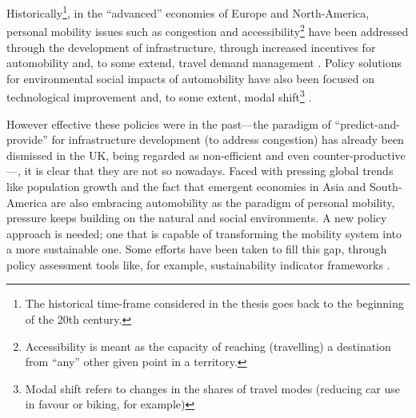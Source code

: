 Historically\footnote{The historical time-frame considered in the thesis goes back to the beginning of the 20th century.}, in the ``advanced'' economies of Europe and North-America, personal mobility issues such as congestion and accessibility\footnote{Accessibility is meant as the capacity of reaching (travelling) a destination from ``any'' other given point in a territory.} have been addressed through the development of infrastructure, through increased incentives for automobility and, to some extend, travel demand management \parencite{lyons2012_VisionsFutureNeed}. Policy solutions for environmental social impacts of automobility have also been focused on technological improvement and, to some extent, modal shift\footnote{Modal shift refers to changes in the shares of travel modes (reducing car use in favour or biking, for example)} \parencite{koehler2009_transitionsmodelsustainable}.

However effective these policies were in the past---the paradigm of ``predict-and-provide'' for infrastructure development (to address congestion) has already been dismissed in the UK, being regarded as non-efficient and even counter-productive \parencite{goodwin2012_ProvidingRoadCapacity}---, it is clear that they are not so nowadays. Faced with pressing global trends like population growth and the fact that emergent economies in Asia and South-America are also embracing automobility as the paradigm of personal mobility, pressure keeps building on the natural and social environments. A new policy approach is needed; one that is capable of transforming the mobility system into a more sustainable one. Some efforts have been taken to fill this gap, through policy assessment tools like, for example, sustainability indicator frameworks \parencite{castillo2010_ELASTICmethodological,haghshenas2012_Urbansustainabletransportation,litman2007_DevelopingIndicatorsComprehensive,shiau2013_Developingindicatorsystem}.


